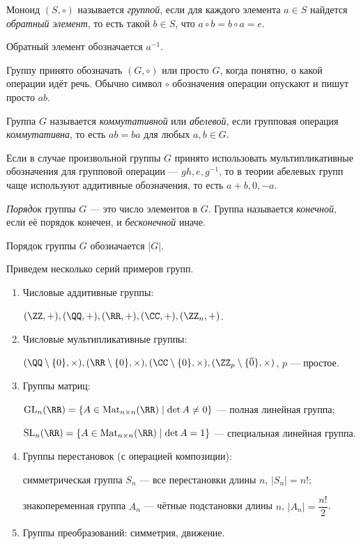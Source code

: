 \begin{definition}
    Моноид $(S, \circ)$ называется \textit{группой}, если для каждого элемента $a \in S$ найдется \textit{обратный элемент}, то есть такой $b \in S$, что $a \circ b = b \circ a = e$.
\end{definition}

Обратный элемент обозначается $a^{-1}$.

Группу принято обозначать $(G, \circ)$ или просто $G$, когда понятно, о какой операции идёт речь. Обычно символ $\circ$ обозначения операции опускают и пишут просто $ab$.

\begin{definition}
    Группа $G$ называется \textit{коммутативной} или \textit{абелевой}, если групповая операция \textit{коммутативна}, то есть $ab = ba$ для любых $a, b \in G$.
\end{definition}

Если в случае произвольной группы $G$ принято использовать мультипликативные обозначения для групповой операции --- $gh, e, g^{-1}$, то в теории абелевых групп чаще используют аддитивные обозначения, то есть $a + b, 0, -a$.

\begin{definition}
    \textit{Порядок} группы $G$ --- это число элементов в $G$. Группа называется \textit{конечной}, если её порядок конечен, и \textit{бесконечной} иначе.
\end{definition}

Порядок группы $G$ обозначается $|G|$.

\bigskip
Приведем несколько серий примеров групп.
\begin{enumerate}
\item Числовые аддитивные группы:

    $(\ZZ, +), (\QQ, +), (\RR, +), (\CC, +), (\ZZ_n, +)$.

\item Числовые мультипликативные группы:
    
    $(\QQ \setminus \{0\}, \times), (\RR \setminus \{0\}, \times), (\CC \setminus \{0\}, \times), (\ZZ_p \setminus \{\overline{0}\}, \times)$, $p$ --- простое.

\item Группы матриц:
    
    $\mathrm{GL}_n(\RR) = \{A \in \mathrm{Mat}_{n \times n}(\RR) \mid \det A \neq 0\}$ --- полная линейная группа;

    $\mathrm{SL}_n(\RR) = \{A \in \mathrm{Mat}_{n \times n}(\RR) \mid \det A = 1\}$ --- специальная линейная группа.

\item Группы перестановок (с операцией композиции):

    симметрическая группа $S_n$ --- все перестановки длины $n$, $|S_n| = n!$;

    знакопеременная группа $A_n$ --- чётные подстановки длины $n$, $|A_n| = \dfrac{n!}{2}$.

\item Группы преобразований: симметрия, движение.
\end{enumerate}


